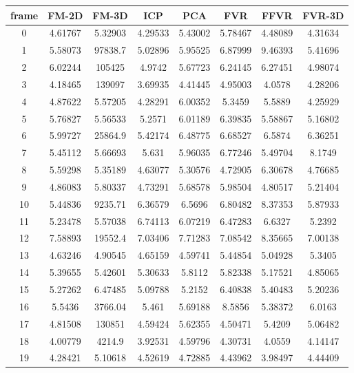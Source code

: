 


\begin{figure}
\centering
\begin{tabular}{cccccccc}
\hline
\textbf{frame} & \textbf{FM-2D} & \textbf{FM-3D} & \textbf{ICP} & \textbf{PCA} & \textbf{FVR} & \textbf{FFVR} & \textbf{FVR-3D}
\\ \hline
0 & 4.61767 & 5.32903 & 4.29533 & 5.43002 & 5.78467 & 4.48089 & 4.31634\\
1 & 5.58073 & 97838.7 & 5.02896 & 5.95525 & 6.87999 & 9.46393 & 5.41696\\
2 & 6.02244 & 105425 & 4.9742 & 5.67723 & 6.24145 & 6.27451 & 4.98074\\
3 & 4.18465 & 139097 & 3.69935 & 4.41445 & 4.95003 & 4.0578 & 4.28206\\
4 & 4.87622 & 5.57205 & 4.28291 & 6.00352 & 5.3459 & 5.5889 & 4.25929\\
5 & 5.76827 & 5.56533 & 5.2571 & 6.01189 & 6.39835 & 5.58867 & 5.16802\\
6 & 5.99727 & 25864.9 & 5.42174 & 6.48775 & 6.68527 & 6.5874 & 6.36251\\
7 & 5.45112 & 5.66693 & 5.631 & 5.96035 & 6.77246 & 5.49704 & 8.1749\\
8 & 5.59298 & 5.35189 & 4.63077 & 5.30576 & 4.72905 & 6.30678 & 4.76685\\
9 & 4.86083 & 5.80337 & 4.73291 & 5.68578 & 5.98504 & 4.80517 & 5.21404\\
10 & 5.44836 & 9235.71 & 6.36579 & 6.5696 & 6.80482 & 8.37353 & 5.87933\\
11 & 5.23478 & 5.57038 & 6.74113 & 6.07219 & 6.47283 & 6.6327 & 5.2392\\
12 & 7.58893 & 19552.4 & 7.03406 & 7.71283 & 7.08542 & 8.35665 & 7.00138\\
13 & 4.63246 & 4.90545 & 4.65159 & 4.59741 & 5.44854 & 5.04928 & 5.3405\\
14 & 5.39655 & 5.42601 & 5.30633 & 5.8112 & 5.82338 & 5.17521 & 4.85065\\
15 & 5.27262 & 6.47485 & 5.09788 & 5.2152 & 6.40838 & 5.40483 & 5.20236\\
16 & 5.5436 & 3766.04 & 5.461 & 5.69188 & 8.5856 & 5.38372 & 6.0163\\
17 & 4.81508 & 130851 & 4.59424 & 5.62355 & 4.50471 & 5.4209 & 5.06482\\
18 & 4.00779 & 4214.9 & 3.92531 & 4.59796 & 4.30731 & 4.0559 & 4.14147\\
19 & 4.28421 & 5.10618 & 4.52619 & 4.72885 & 4.43962 & 3.98497 & 4.44409\\

\end{tabular}
\end{figure}
